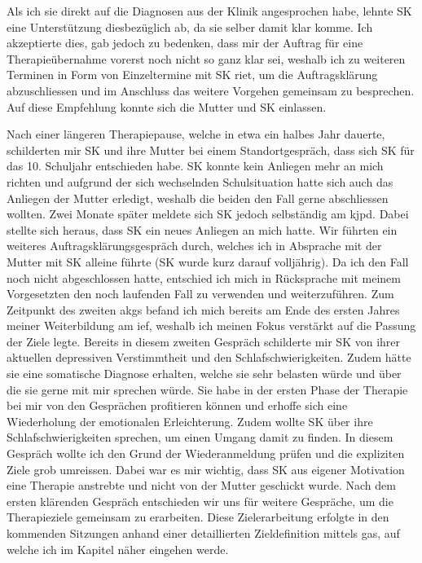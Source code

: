 Als ich sie direkt auf die Diagnosen aus der Klinik angesprochen habe, lehnte SK eine Unterstützung diesbezüglich ab, da sie selber damit klar komme. Ich akzeptierte dies, gab jedoch zu bedenken, dass mir der Auftrag für eine Therapieübernahme vorerst noch nicht so ganz klar sei, weshalb ich zu weiteren Terminen in Form von Einzeltermine mit SK riet, um die Auftragsklärung abzuschliessen und im Anschluss das weitere Vorgehen gemeinsam zu besprechen. Auf diese Empfehlung konnte sich die Mutter und SK einlassen.

Nach einer längeren Therapiepause, welche in etwa ein halbes Jahr dauerte, schilderten mir SK und ihre Mutter bei einem Standortgespräch, dass sich SK für das 10. Schuljahr entschieden habe. SK konnte kein Anliegen mehr an mich richten und aufgrund der sich wechselnden Schulsituation hatte sich auch das Anliegen der Mutter erledigt, weshalb die beiden den Fall gerne abschliessen wollten. Zwei Monate später meldete sich SK jedoch selbständig am \ac{kjpd}. Dabei stellte sich heraus, dass SK ein neues Anliegen an mich hatte. Wir führten ein weiteres Auftragsklärungsgespräch durch, welches ich in Absprache mit der Mutter mit SK alleine führte (SK wurde kurz darauf volljährig). Da ich den Fall noch nicht abgeschlossen hatte, entschied ich mich in Rücksprache mit meinem Vorgesetzten den noch laufenden Fall zu verwenden und weiterzuführen. Zum Zeitpunkt des zweiten \acp{akg} befand ich mich bereits am Ende des ersten Jahres meiner Weiterbildung am \ac{ief}, weshalb ich meinen Fokus verstärkt auf die Passung der Ziele legte. Bereits in diesem zweiten Gespräch schilderte mir SK von ihrer aktuellen depressiven Verstimmtheit und den Schlafschwierigkeiten. Zudem hätte sie eine somatische Diagnose erhalten, welche sie sehr belasten würde und über die sie gerne mit mir sprechen würde. Sie habe in der ersten Phase der Therapie bei mir von den Gesprächen profitieren können und erhoffe sich eine Wiederholung der emotionalen Erleichterung. Zudem wollte SK über ihre Schlafschwierigkeiten sprechen, um einen Umgang damit zu finden. In diesem Gespräch wollte ich den Grund der Wiederanmeldung prüfen und die expliziten Ziele grob umreissen. Dabei war es mir wichtig, dass SK aus eigener Motivation eine Therapie anstrebte und nicht von der Mutter geschickt wurde. Nach dem ersten klärenden Gespräch entschieden wir uns für weitere Gespräche, um die Therapieziele gemeinsam zu erarbeiten. Diese Zielerarbeitung erfolgte in den kommenden Sitzungen anhand einer detaillierten Zieldefinition mittels \ac{gas}, auf welche ich im Kapitel \textit{} näher eingehen werde.

